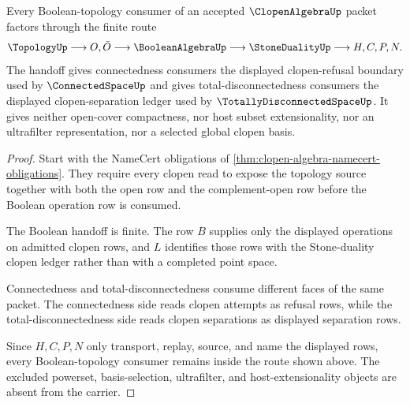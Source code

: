 \begin{theorem}
\label{thm:clopen-algebra-boolean-topology-handoff}
Every Boolean-topology consumer of an accepted $\ClopenAlgebraUp$ packet factors through the finite route
$$
\TopologyUp
\longrightarrow
O,\bar O
\longrightarrow
\BooleanAlgebraUp
\longrightarrow
\StoneDualityUp
\longrightarrow
H,C,P,N .
$$
The handoff gives connectedness consumers the displayed clopen-refusal boundary used by $\ConnectedSpaceUp$ and gives total-disconnectedness consumers the displayed clopen-separation ledger used by $\TotallyDisconnectedSpaceUp$. It gives neither open-cover compactness, nor host subset extensionality, nor an ultrafilter representation, nor a selected global clopen basis.
\end{theorem}
\begin{proof}
Start with the NameCert obligations of \autoref{thm:clopen-algebra-namecert-obligations}. They require every clopen read to expose the topology source together with both the open row and the complement-open row before the Boolean operation row is consumed.

The Boolean handoff is finite. The row $B$ supplies only the displayed operations on admitted clopen rows, and $L$ identifies those rows with the Stone-duality clopen ledger rather than with a completed point space.

Connectedness and total-disconnectedness consume different faces of the same packet. The connectedness side reads clopen attempts as refusal rows, while the total-disconnectedness side reads clopen separations as displayed separation rows.

Since $H,C,P,N$ only transport, replay, source, and name the displayed rows, every Boolean-topology consumer remains inside the route shown above. The excluded powerset, basis-selection, ultrafilter, and host-extensionality objects are absent from the carrier.
\end{proof}



